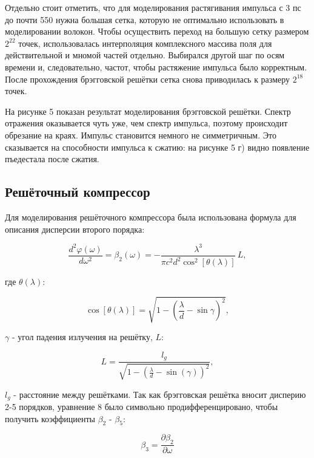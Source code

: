 \documentclass[12pt]{article}
\begin{document}
Отдельно стоит отметить, что для моделирования растягивания импульса с 3 пс до почти 550 нужна большая сетка, которую
не оптимально использовать в моделировании волокон. Чтобы осуществить переход на большую сетку размером $2^{22}$ точек,
использовалась интерполяция комплексного массива поля для действительной и мномой частей отдельно. Выбирался другой
шаг по осям времени и, следовательно, частот, чтобы растяжение импульса было корректным. После прохождения брэгговской
решётки сетка снова приводилась к размеру $2^{18}$ точек.

На рисунке 5 показан результат моделирования брэгговской
решётки. Спектр отражения оказывается чуть уже, чем спектр импульса, поэтому происходит обрезание на краях. Импульс становится
немного не симметричным. Это сказывается на способности импульса к сжатию: на рисунке 5 г) видно появление пъедестала
после сжатия.

\subsection{Решёточный компрессор}

Для моделирования решёточного компрессора была использована формула \cite{wollenhaupt2007femtosecond} для описания
дисперсии второго порядка:

\begin{equation}
    \frac{d^2 \varphi(\omega)}{d\omega^2} = \beta_2(\omega) = -\frac{\lambda^3}{\pi c^2 d^2 \cos^2[\theta(\lambda)]} \, L,
\end{equation}

где $\theta(\lambda)$:

\begin{equation}
    \cos[\theta(\lambda)] = \sqrt{1 - \left( \frac{\lambda}{d} - \sin\gamma \right)^2},
\end{equation}

$\gamma$ - угол падения излучения на решётку, $L$:

\begin{equation}
    L = \frac{l_g}{\sqrt{1 - \left( \frac{\lambda}{d} - \sin(\gamma) \right)^2}},
\end{equation}

$l_g$ - расстояние между решётками. Так как брэгговская решётка вносит дисперию 2-5 порядков, уравнение 8 было
символьно продифференцировано, чтобы получить коэффициенты $\beta_2$ - $\beta_5$:

\begin{equation}
    \beta_3 = \frac{\partial \beta_2}{\partial \omega}
\end{equation}
\end{document}

